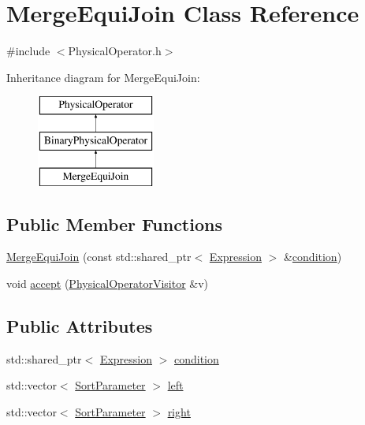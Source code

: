 \hypertarget{class_merge_equi_join}{\section{Merge\+Equi\+Join Class Reference}
\label{class_merge_equi_join}
}


{\ttfamily \#include $<$Physical\+Operator.\+h$>$}

Inheritance diagram for Merge\+Equi\+Join\+:\begin{figure}[H]
\begin{center}
\leavevmode
\includegraphics[height=3.000000cm]{class_merge_equi_join}
\end{center}
\end{figure}
\subsection*{Public Member Functions}
\begin{DoxyCompactItemize}
\item 
\hyperlink{class_merge_equi_join_a16fa9f23ebbd531c398b121a99c18afc}{Merge\+Equi\+Join} (const std\+::shared\+\_\+ptr$<$ \hyperlink{class_expression}{Expression} $>$ \&\hyperlink{class_merge_equi_join_ac334a1377a90c2876f9a5fad38d1836e}{condition})
\item 
void \hyperlink{class_merge_equi_join_a0a88e744444a5a539d58aac25c609a9c}{accept} (\hyperlink{class_physical_operator_visitor}{Physical\+Operator\+Visitor} \&v)
\end{DoxyCompactItemize}
\subsection*{Public Attributes}
\begin{DoxyCompactItemize}
\item 
std\+::shared\+\_\+ptr$<$ \hyperlink{class_expression}{Expression} $>$ \hyperlink{class_merge_equi_join_ac334a1377a90c2876f9a5fad38d1836e}{condition}
\item 
std\+::vector$<$ \hyperlink{class_sort_parameter}{Sort\+Parameter} $>$ \hyperlink{class_merge_equi_join_a10a2e1737a5d7c2e554f55b0e0863d04}{left}
\item 
std\+::vector$<$ \hyperlink{class_sort_parameter}{Sort\+Parameter} $>$ \hyperlink{class_merge_equi_join_a0d32b50a198ce479cae3bbdc52b9766a}{right}
\end{DoxyCompactItemize}


